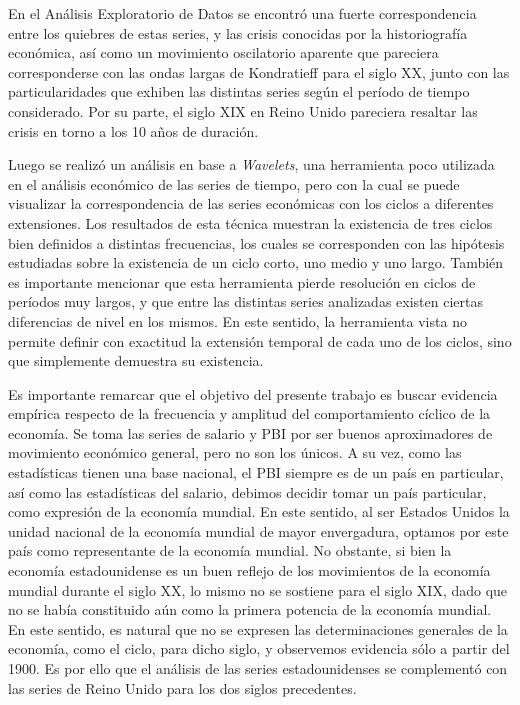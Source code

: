 \documentclass[a4paper]{article}
\begin{document}
En el Análisis Exploratorio de Datos se encontró una fuerte correspondencia entre los quiebres de estas series, y las crisis conocidas por la historiografía económica, así como un movimiento oscilatorio aparente que pareciera corresponderse con las ondas largas de Kondratieff para el siglo XX, junto con las particularidades que exhiben las distintas series según el período de tiempo considerado. Por su parte, el siglo XIX en Reino Unido pareciera resaltar las crisis en torno a los 10 años de duración.

Luego se realizó un análisis en base a \textit{Wavelets}, una herramienta poco utilizada en el análisis económico de las series de tiempo, pero con la cual se puede visualizar la correspondencia de las series económicas con los ciclos a diferentes extensiones. Los resultados de esta técnica muestran la existencia de tres ciclos bien definidos a distintas frecuencias, los cuales se corresponden con las hipótesis estudiadas sobre la existencia de un ciclo corto, uno medio y uno largo. También es importante mencionar que esta herramienta pierde resolución en ciclos de períodos muy largos, y que entre las distintas series analizadas existen ciertas diferencias de nivel en los mismos. En este sentido, la herramienta vista no permite definir con exactitud la extensión temporal de cada uno de los ciclos, sino que simplemente demuestra su existencia.

Es importante remarcar que el objetivo del presente trabajo es buscar evidencia empírica respecto de la frecuencia y amplitud del comportamiento cíclico de la economía. Se toma las series de salario y PBI por ser buenos aproximadores de movimiento económico general, pero no son los únicos. A su vez, como las estadísticas tienen una base nacional, el PBI siempre es de un país en particular, así como las estadísticas del salario, debimos decidir tomar un país particular, como expresión de la economía mundial. En este sentido, al ser Estados Unidos la unidad nacional de la economía mundial de mayor envergadura, optamos por este país como representante de la economía mundial. No obstante, si bien la economía estadounidense es un buen reflejo de los movimientos de la economía mundial durante el siglo XX, lo mismo no se sostiene para el siglo XIX, dado que no se había constituido aún como la primera potencia de la economía mundial. En este sentido, es natural que no se expresen las determinaciones generales de la economía, como el ciclo, para dicho siglo, y observemos evidencia sólo a partir del 1900. Es por ello que el análisis de las series estadounidenses se complementó con las series de Reino Unido para los dos siglos precedentes. 
\end{document}
